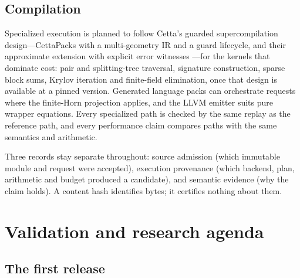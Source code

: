 \documentclass[11pt]{article}
\theoremstyle{definition}
\theoremstyle{plain}
\begin{document}
\subsection{Compilation}

Specialized execution is planned to follow Cetta's guarded supercompilation design---CettaPacks with
a multi-geometry IR and a guard lifecycle, and their approximate extension with explicit error
witnesses \cite{cettapacks}---for the kernels that dominate cost: pair and splitting-tree traversal,
signature construction, sparse block sums, Krylov iteration and finite-field elimination, once that
design is available at a pinned version. Generated language packs can orchestrate requests where
the finite-Horn projection applies, and the LLVM emitter suits pure wrapper equations. Every
specialized path is checked by the same replay as the reference path, and every performance claim
compares paths with the same semantics and arithmetic.

Three records stay separate throughout: source admission (which immutable module and request were
accepted), execution provenance (which backend, plan, arithmetic and budget produced a candidate),
and semantic evidence (why the claim holds). A content hash identifies bytes; it certifies nothing
about them.

\section{Validation and research agenda}\label{sec:agenda}

\subsection{The first release}
\end{document}
